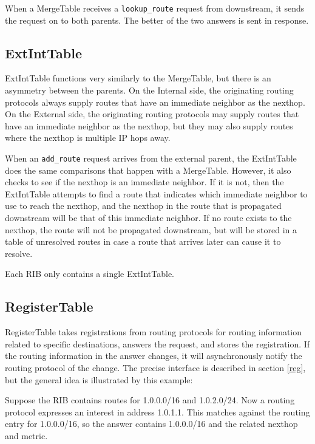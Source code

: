 \documentclass[11pt]{article}
\begin{document}
When a MergeTable receives a {\tt lookup\_route} request from
downstream, it sends the request on to both parents.  The better of
the two answers is sent in response.

\subsection{ExtIntTable}

ExtIntTable functions very similarly to the MergeTable, but there is
an asymmetry between the parents.  On the Internal side, the
originating routing protocols always supply routes that have an
immediate neighbor as the nexthop.  On the External side, the
originating routing protocols may supply routes that have an immediate
neighbor as the nexthop, but they may also supply routes where the
nexthop is multiple IP hops away.  

When an {\tt add\_route} request arrives from the external parent, the
ExtIntTable does the same comparisons that happen with a MergeTable.
However, it also checks to see if the nexthop is an immediate
neighbor.  If it is not, then the ExtIntTable attempts to find a route
that indicates which immediate neighbor to use to reach the nexthop,
and the nexthop in the route that is propagated downstream will be
that of this immediate neighbor.  If no route exists to the nexthop,
the route will not be propagated downstream, but will be stored in a
table of unresolved routes in case a route that arrives later can
cause it to resolve.

Each RIB only contains a single ExtIntTable.

\subsection{RegisterTable}

RegisterTable takes registrations from routing protocols for routing
information related to specific destinations, answers the request, and
stores the registration.  If the routing information in the
answer changes, it will asynchronously notify the routing protocol of
the change.  The precise interface is described in section \ref{reg},
but the general idea is illustrated by this example:

Suppose the RIB contains routes for 1.0.0.0/16 and 1.0.2.0/24.  Now a
routing protocol expresses an interest in address 1.0.1.1.  This
matches against the routing entry for 1.0.0.0/16, so the answer contains
1.0.0.0/16 and the related nexthop and metric.
\end{document}
